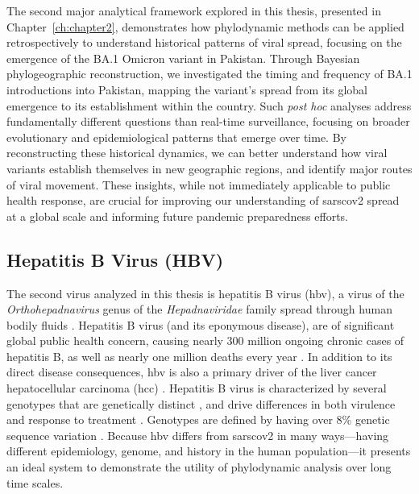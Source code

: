 The second major analytical framework explored in this thesis, presented in Chapter~\ref{ch:chapter2}, demonstrates how phylodynamic methods can be applied retrospectively to understand historical patterns of viral spread, focusing on the emergence of the BA.1 Omicron variant in Pakistan.
Through Bayesian phylogeographic reconstruction, we investigated the timing and frequency of BA.1 introductions into Pakistan, mapping the variant's spread from its global emergence to its establishment within the country.
Such \textit{post hoc} analyses address fundamentally different questions than real-time surveillance, focusing on broader evolutionary and epidemiological patterns that emerge over time.
By reconstructing these historical dynamics, we can better understand how viral variants establish themselves in new geographic regions, and identify major routes of viral movement.
These insights, while not immediately applicable to public health response, are crucial for improving our understanding of \gls{sarscov2} spread at a global scale and informing future pandemic preparedness efforts.

\subsection{Hepatitis B Virus (HBV)}
The second virus analyzed in this thesis is hepatitis B virus (\gls{hbv}), a virus of the \textit{Orthohepadnavirus} genus of the \textit{Hepadnaviridae} family spread through human bodily fluids \citep{seeger2000hepatitis}.
Hepatitis B virus (and its eponymous disease), are of significant global public health concern, causing nearly 300 million ongoing chronic cases of hepatitis B, as well as nearly one million deaths every year \citep{revill2020evolution}.
In addition to its direct disease consequences, \gls{hbv} is also a primary driver of the liver cancer hepatocellular carcinoma (\gls{hcc}) \citep{levrero2016mechanisms}.
Hepatitis B virus is characterized by several genotypes that are genetically distinct \citep{lin2017natural}, and drive differences in both virulence and response to treatment \citep{kao2000hepatitis}.
Genotypes are defined by having over 8\% genetic sequence variation \citep{bartholomeusz2004hepatitis}.
Because \gls{hbv} differs from \gls{sarscov2} in many ways---having different epidemiology, genome, and history in the human population---it presents an ideal system to demonstrate the utility of phylodynamic analysis over long time scales.

